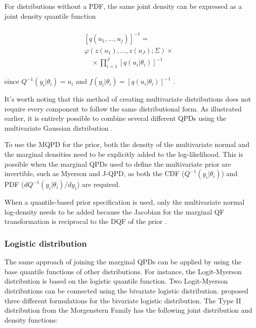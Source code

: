 \documentclass[
  fleqn,
  deca,
  blindrev
]{informs4}
\begin{document}
For distributions without a PDF, the same joint density can be expressed
as a joint density quantile function

\[
\begin{gathered}
\\
[q(u_1,\dots,u_j)]^{-1}=\\
\varphi(z(u_1),\dots,z(u_J);\Sigma)\times\\
\quad \times \prod_{i=1}^{J}[q(u_i\vert\theta_i)]^{-1}
\end{gathered}
\]

since \(Q^{-1}(y_i\vert\theta_i)=u_i\) and
\(f(y_i\vert\theta_i)=[q(u_i\vert\theta_i)]^{-1}\)
\citep{gilchrist2000StatisticalModellingQuantile}.

It's worth noting that this method of creating multivariate
distributions does not require every component to follow the same
distributional form. As illustrated earlier, it is entirely possible to
combine several different QPDs using the multivariate Gaussian
distribution \citep{drovandi2011LikelihoodfreeBayesianEstimation}.

To use the MQPD for the prior, both the density of the multivariate
normal and the marginal densities need to be explicitly added to the
log-likelihood. This is possible when the marginal QPDs used to define
the multivariate prior are invertible, such as Myerson and J-QPD, as
both the CDF (\(Q^{-1}(y_i\vert\theta_i)\)) and PDF
(\(dQ^{-1}(y_i\vert\theta_i)/dy_i\)) are required.

When a quantile-based prior specification is used, only the multivariate
normal log-density needs to be added because the Jacobian for the
marginal QF transformation is reciprocal to the DQF of the prior
\citep{perepolkin2023TenetsQuantilebasedInference}.

\subsubsection{Logistic distribution}\label{logistic-distribution}

The same approach of joining the marginal QPDs can be applied by using
the base quantile functions of other distributions. For instance, the
Logit-Myerson distribution \citep{wilson2023ReconciliationExpertPriors}
is based on the logistic quantile function. Two Logit-Myerson
distributions can be connected using the bivariate logistic
distribution. \citep{gumbel1961BivariateLogisticDistributions} proposed
three different formulations for the bivariate logistic distribution.
The Type II distribution from the Morgenstern Family
\citep{sajeevkumar2014EstimationParameterMorgenstern, basikhasteh2021BayesianEstimationMorgenstern}
has the following joint distribution and density functions:
\end{document}
